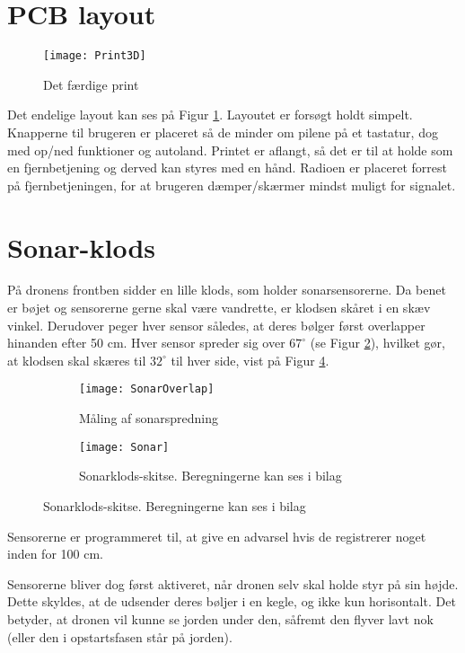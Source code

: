 \documentclass[Main]{subfiles}
\begin{document}
\section{PCB layout}

\begin{figure}[H]
\centering
\texttt{[image: Print3D]}
\caption{Det færdige print}
\label{fig: Print3D}
\end{figure}
Det endelige layout kan ses på Figur \ref{fig: Print3D}.
Layoutet er forsøgt holdt simpelt. 
Knapperne til brugeren er placeret så de minder om pilene på et tastatur, dog med op/ned funktioner og autoland.
Printet er aflangt, så det er til at holde som en fjernbetjening og derved kan styres med en hånd.
Radioen er placeret forrest på fjernbetjeningen, for at brugeren dæmper/skærmer mindst muligt for signalet.  


\newpage
\section{Sonar-klods}\label{Sec:Sonar}
På dronens frontben sidder en lille klods, som holder sonarsensorerne.
Da benet er bøjet og sensorerne gerne skal være vandrette, er klodsen skåret i en skæv vinkel.
Derudover peger hver sensor således, at deres bølger først overlapper hinanden efter 50 cm. 
Hver sensor spreder sig over $67^\circ$ (se Figur \ref{Fig:SonarMeasure}), hvilket gør, at klodsen skal skæres til $32^\circ$ til hver side, vist på Figur \ref{Fig:SonarSkitse}.
\begin{figure}[H]
\centering
	\begin{subfigure}[b]{0.45\textwidth}
		\texttt{[image: SonarOverlap]}
		\caption{Måling af sonarspredning}
		\label{Fig:SonarMeasure}
	\end{subfigure}
	\quad
	\begin{subfigure}[b]{0.45\textwidth}
	\centering
		\texttt{[image: Sonar]}
		\caption{Sonarklods-skitse. Beregningerne kan ses i bilag\cite{Klods}}
		\label{Fig:SonarSkitse}
	\end{subfigure}
\end{figure}

Sensorerne er programmeret til, at give en advarsel hvis de registrerer noget inden for 100 cm.

Sensorerne bliver dog først aktiveret, når dronen selv skal holde styr på sin højde. Dette skyldes, at de udsender deres bøljer i en kegle, og ikke kun horisontalt. 
Det betyder, at dronen vil kunne se jorden under den, såfremt den flyver lavt nok (eller den i opstartsfasen står på jorden).
\end{document}
